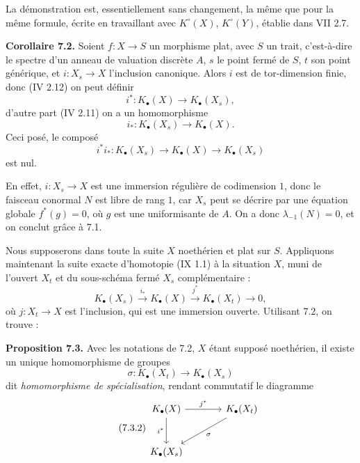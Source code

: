 \documentclass[11pt]{article}
\newcommand{\Spec}{\operatorname{Spec}}
\begin{document}
La démonstration est, essentiellement sans changement, la même que pour la même formule, écrite en travaillant avec \(K^\circ(X)\), \(K^\circ(Y)\), établie dans VII 2.7.

\textbf{Corollaire 7.2.} Soient \(f:X\to S\) un morphisme plat, avec \(S\) un trait, c'est-à-dire le spectre d'un anneau de valuation discrète \(A\), \(s\) le point fermé de \(S\), \(t\) son point générique, et \(i:X_s\to X\) l'inclusion canonique. Alors \(i\) est de tor-dimension finie, donc (IV 2.12) on peut définir
\[
 i^*:K_\bullet(X)\longrightarrow K_\bullet(X_s),
\]
d'autre part (IV 2.11) on a un homomorphisme
\[
 i_*:K_\bullet(X_s)\longrightarrow K_\bullet(X).
\]
Ceci posé, le composé
\[
 i^*i_*:K_\bullet(X_s)\longrightarrow K_\bullet(X)\longrightarrow K_\bullet(X_s)
\]
est nul.

En effet, \(i:X_s\to X\) est une immersion régulière de codimension \(1\), donc le faisceau conormal \(N\) est libre de rang \(1\), car \(X_s\) peut se décrire par une équation globale \(f^*(g)=0\), où \(g\) est une uniformisante de \(A\). On a donc \(\lambda_{-1}(N)=0\), et on conclut grâce à 7.1.

Nous supposerons dans toute la suite \(X\) noethérien et plat sur \(S\). Appliquons maintenant la suite exacte d'homotopie (IX 1.1) à la situation \(X\), muni de l'ouvert \(X_t\) et du sous-schéma fermé \(X_s\) complémentaire :
\[
K_\bullet(X_s)\xrightarrow{i_*}K_\bullet(X)\xrightarrow{j^*}K_\bullet(X_t)\longrightarrow0,
\]
où \(j:X_t\to X\) est l'inclusion, qui est une immersion ouverte. Utilisant 7.2, on trouve :

\textbf{Proposition 7.3.} Avec les notations de 7.2, \(X\) étant supposé noethérien, il existe un unique homomorphisme de groupes
\begin{equation}\tag{7.3.1}
 \sigma:K_\bullet(X_t)\longrightarrow K_\bullet(X_s)
\end{equation}
dit \emph{homomorphisme de spécialisation}, rendant commutatif le diagramme
\begin{equation}\tag{7.3.2}
\begin{tikzcd}[column sep=large,row sep=large]
K_\bullet(X) \arrow[r,"j^*"] \arrow[d,"i^*"'] & K_\bullet(X_t) \arrow[dl,"\sigma"]\\
K_\bullet(X_s) &
\end{tikzcd}
\end{equation}



\providecommand{\Kalg}{K_{\mathrm{alg}}}
\providecommand{\Gralg}{\operatorname{Gr}_{\mathrm{alg}}}
\providecommand{\Grnum}{\operatorname{Gr}_{\mathrm{num}}}
\providecommand{\Knum}{K_{\mathrm{num}}}
\providecommand{\Cl}{\operatorname{Cl}}
\providecommand{\Ch}{\operatorname{Ch}}
\providecommand{\Nm}{\operatorname{N}}
\providecommand{\colim}{\varinjlim}
\providecommand{\Hens}{\operatorname{Hens}}
\providecommand{\red}{\mathrm{red}}
\providecommand{\Spec}{\operatorname{Spec}}
\providecommand{\coker}{\operatorname{coker}}
\end{document}
